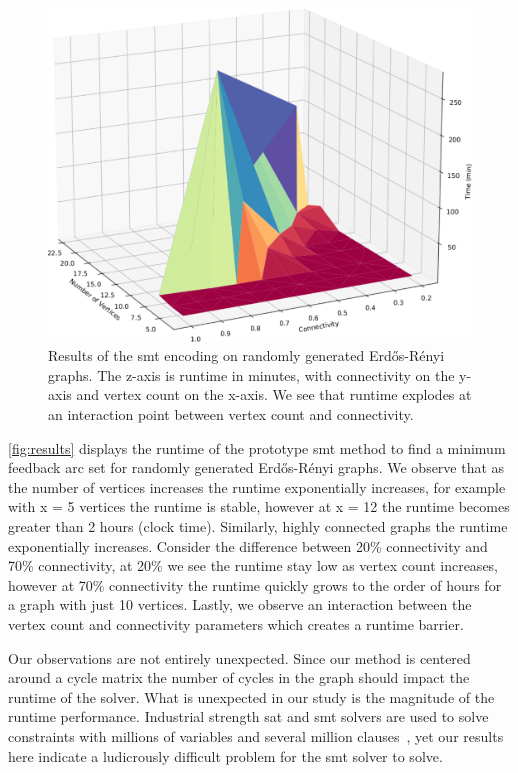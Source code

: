 \label{section:results-and-discussion}
%
\begin{figure}[t]
    \centering
    \includegraphics[width=1\linewidth]{Figures/big_ol_cliff.pdf}
    \caption{Results of the \ac{smt} encoding on randomly generated
      Erd\H{o}s-R\'{e}nyi graphs. The z-axis is runtime in minutes, with
      connectivity on the y-axis and vertex count on the x-axis. We see that
      runtime explodes at an interaction point between vertex count and
      connectivity.}%
    \label{fig:results}
\end{figure}%

\autoref{fig:results} displays the runtime of the prototype \ac{smt} method to
find a minimum feedback arc set for randomly generated Erd\H{o}s-R\'{e}nyi
graphs. We observe that as the number of vertices increases the runtime
exponentially increases, for example with x = 5 vertices the runtime is stable,
however at x = 12 the runtime becomes greater than 2 hours (clock time).
Similarly, highly connected graphs the runtime exponentially increases. Consider
the difference between 20\% connectivity and 70\% connectivity, at 20\% we see
the runtime stay low as vertex count increases, however at 70\% connectivity the
runtime quickly grows to the order of hours for a graph with just 10 vertices.
Lastly, we observe an interaction between the vertex count and connectivity
parameters which creates a runtime barrier.

Our observations are not entirely unexpected. Since our method is centered
around a cycle matrix the number of cycles in the graph should impact the
runtime of the solver. What is unexpected in our study is the magnitude of the
runtime performance. Industrial strength \ac{sat} and \ac{smt} solvers are used
to solve constraints with millions of variables and several million
clauses~\cite{10.5555/1550723}, yet our results here indicate a ludicrously
difficult problem for the \ac{smt} solver to solve.

